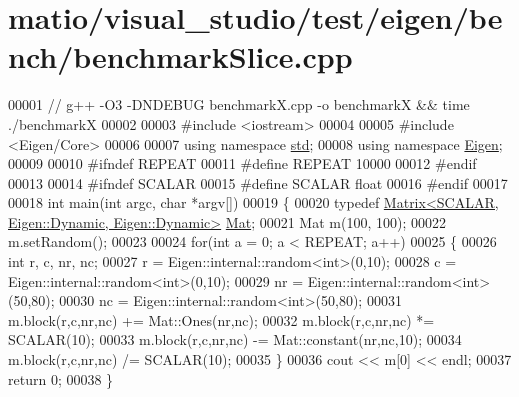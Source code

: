 \hypertarget{matio_2visual__studio_2test_2eigen_2bench_2benchmark_slice_8cpp_source}{}\section{matio/visual\+\_\+studio/test/eigen/bench/benchmark\+Slice.cpp}
\label{matio_2visual__studio_2test_2eigen_2bench_2benchmark_slice_8cpp_source}

\begin{DoxyCode}
00001 \textcolor{comment}{// g++ -O3 -DNDEBUG benchmarkX.cpp -o benchmarkX && time ./benchmarkX}
00002 
00003 \textcolor{preprocessor}{#include <iostream>}
00004 
00005 \textcolor{preprocessor}{#include <Eigen/Core>}
00006 
00007 \textcolor{keyword}{using namespace }\hyperlink{namespacestd}{std};
00008 \textcolor{keyword}{using namespace }\hyperlink{namespace_eigen}{Eigen};
00009 
00010 \textcolor{preprocessor}{#ifndef REPEAT}
00011 \textcolor{preprocessor}{#define REPEAT 10000}
00012 \textcolor{preprocessor}{#endif}
00013 
00014 \textcolor{preprocessor}{#ifndef SCALAR}
00015 \textcolor{preprocessor}{#define SCALAR float}
00016 \textcolor{preprocessor}{#endif}
00017 
00018 \textcolor{keywordtype}{int} main(\textcolor{keywordtype}{int} argc, \textcolor{keywordtype}{char} *argv[])
00019 \{
00020   \textcolor{keyword}{typedef} \hyperlink{group___core___module_class_eigen_1_1_matrix}{Matrix<SCALAR, Eigen::Dynamic, Eigen::Dynamic>} 
      \hyperlink{group___core___module}{Mat};
00021   Mat m(100, 100);
00022   m.setRandom();
00023 
00024   \textcolor{keywordflow}{for}(\textcolor{keywordtype}{int} a = 0; a < REPEAT; a++)
00025   \{
00026     \textcolor{keywordtype}{int} r, c, nr, nc;
00027     r = Eigen::internal::random<int>(0,10);
00028     c = Eigen::internal::random<int>(0,10);
00029     nr = Eigen::internal::random<int>(50,80);
00030     nc = Eigen::internal::random<int>(50,80);
00031     m.block(r,c,nr,nc) += Mat::Ones(nr,nc);
00032     m.block(r,c,nr,nc) *= SCALAR(10);
00033     m.block(r,c,nr,nc) -= Mat::constant(nr,nc,10);
00034     m.block(r,c,nr,nc) /= SCALAR(10);
00035   \}
00036   cout << m[0] << endl;
00037   \textcolor{keywordflow}{return} 0;
00038 \}
\end{DoxyCode}

